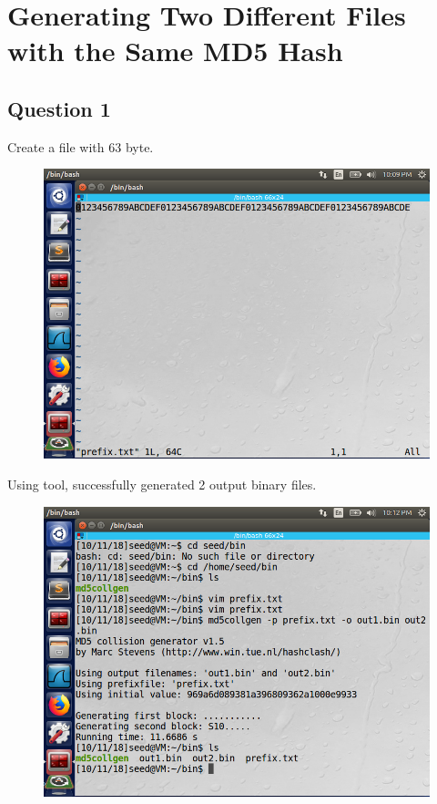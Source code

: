 \documentclass{article}
\begin{document}
\maketitle
\section{Generating Two Different Files with the Same MD5 Hash}
\subsection{Question 1}
Create a  file with 63 byte.
\begin{figure}[H]\centering\includegraphics[width=\textwidth]{ss/01.png}\end{figure}
Using  tool, successfully generated 2 output binary files.
\begin{figure}[H]\centering\includegraphics[width=\textwidth]{ss/02.png}\end{figure}
\end{document}
